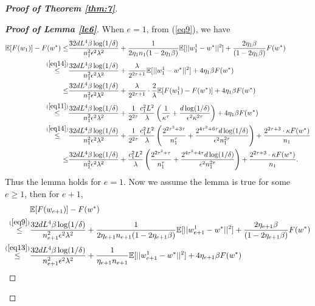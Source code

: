 \documentclass[12pt]{alt2022} %
\begin{document}
\begin{proof}[{\bf Proof of Theorem \ref{thm:7}}]
\begin{proof}[{\bf Proof of Lemma \ref{le6}}]
When $e=1$, from (\ref{eq9}), we have
	\begin{equation*}
	\begin{aligned}
	\mathbb{E}[F(w_1)]-F(w^{*})\leq&\frac{32dL^4\beta\log(1/\delta)}{n_1^2\epsilon^2\lambda^2}+ \frac{1}{2\eta_1 n_1(1-2\eta_1 \beta)} \mathbb{E}[||w_1^1-w^{*}||^2]+\frac{2\eta_1\beta}{(1-2\eta_1\beta)}F(w^{*})\\
	\overset{(\ref{eq14})}{	\leq}&\frac{32dL^4\beta\log(1/\delta)}{n_1^2\epsilon^2\lambda^2}+ \frac{\lambda}{2^{2\tau+1}} \mathbb{E}[||w_1^1-w^{*}||^2]+4\eta_1\beta F(w^{*})\\
{\leq}&\frac{32dL^4\beta\log(1/\delta)}{n_1^2\epsilon^2\lambda^2}+ \frac{\lambda}{2^{2\tau+1}} \cdot \frac{2}{\lambda}\mathbb{E}[F(w_1^1)-F(w^{*})]+4\eta_1\beta F(w^{*})\\
	\overset{(\ref{eq11})}{\leq}&\frac{32dL^4\beta\log(1/\delta)}{n_1^2\epsilon^2\lambda^2}+ \frac{1}{2^{2\tau}} \frac{c_1^2L^2}{\lambda}\left(\frac{1}{\kappa^{\tau}}+\frac{d\log(1/\delta)}{\epsilon^2{\kappa}^{2\tau}}\right)+4\eta_1\beta F(w^{*})\\
	\overset{(\ref{eq14})}{\leq} &\frac{32dL^4\beta\log(1/\delta)}{n_1^2\epsilon^2\lambda^2}+ \frac{1}{2^{2\tau}} \frac{c_1^2L^2}{\lambda}\left(\frac{2^{2\tau^2+3\tau}}{n_1^{\tau}}+\frac{2^{4\tau^2+6\tau}d\log(1/\delta)}{\epsilon^2n_1^{2\tau}}\right)+\frac{	2^{2\tau+3} \cdot \kappa F(w^{*})}{n_1}
	\\
	\leq &\frac{32dL^4\beta\log(1/\delta)}{n_1^2\epsilon^2\lambda^2}+ \frac{c_1^2L^2}{\lambda}\left(\frac{2^{2\tau^2+\tau}}{n_1^{\tau}}+\frac{2^{4\tau^2+4\tau}d\log(1/\delta)}{\epsilon^2n_1^{2\tau}}\right)+\frac{	2^{2\tau+3} \cdot \kappa F(w^{*})}{n_1}.
	\end{aligned}
	\end{equation*}
	Thus the lemma holds for $e=1$. Now we assume the lemma is true for some $e\geq 1$, then for $e+1$, 
	\begin{equation*}
	\begin{aligned}
&\mathbb{E}[F(w_{e+1})]-F(w^*)\\
\overset{(\ref{eq9})}{\leq}& \frac{32dL^4\beta\log(1/\delta)}{n_{e+1}^2\epsilon^2\lambda^2}+ \frac{1}{2\eta_{e+1} n_{e+1}(1-2\eta_{e+1} \beta)} \mathbb{E}[||w_{e+1}^1-w^{*}||^2]+\frac{2\eta_{e+1}\beta}{(1-2\eta_{e+1}\beta)}F(w^{*})\\
	\overset{(\ref{eq13})}{\leq} 	& \frac{32dL^4\beta\log(1/\delta)}{n_{e+1}^2\epsilon^2\lambda^2}+\frac{1}{\eta_{e+1} n_{e+1}} \mathbb{E}[||w_{e+1}^1-w^{*}||^2]+4\eta_{e+1}\beta F(w^{*})\\

\end{aligned}
\end{equation*}
\end{proof}
\end{proof}
\end{document}
